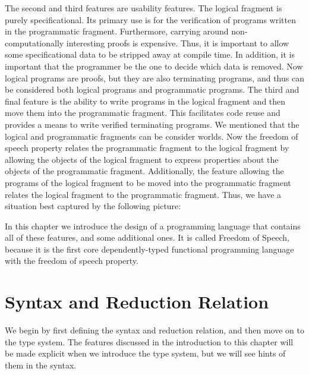 The second and third features are usability features.  The logical
fragment is purely specificational.  Its primary use is for the
verification of programs written in the programmatic fragment.
Furthermore, carrying around non-computationally interesting proofs is
expensive.  Thus, it is important to allow some specificational data
to be stripped away at compile time.  In addition, it is important
that the programmer be the one to decide which data is removed.  Now
logical programs are proofs, but they are also terminating programs,
and thus can be considered both logical programs and programmatic
programs.  The third and final feature is the ability to write
programs in the logical fragment and then move them into the
programmatic fragment.  This facilitates code reuse and provides a
means to write verified terminating programs.  We mentioned that the
logical and programmatic fragments can be consider worlds.  Now the
freedom of speech property relates the programmatic fragment to the
logical fragment by allowing the objects of the logical fragment to
express properties about the objects of the programmatic fragment.
Additionally, the feature allowing the programs of the logical
fragment to be moved into the programmatic fragment relates the
logical fragment to the programmatic fragment.  Thus, we have a
situation best captured by the following picture:
\begin{center}
\end{center}
In this chapter we introduce the design of a programming language that
contains all of these features, and some additional ones.  It is
called Freedom of Speech, because it is the first core
dependently-typed functional programming language with the freedom of
speech property.

\section{Syntax and Reduction Relation}
\label{sec:syntax_and_reduction_relation}
We begin by first defining the syntax and reduction relation, and then
move on to the type system.  The features discussed in the
introduction to this chapter will be made explicit when we introduce
the type system, but we will see hints of them in the syntax.

